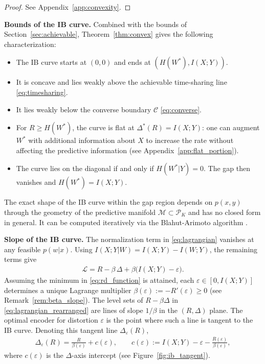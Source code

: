\documentclass[11pt]{article}
\begin{document}
\begin{proof}
    See Appendix~\ref{app:convexity}.
\end{proof}

\medskip
\noindent\textbf{Bounds of the IB curve.}
Combined with the bounds of Section~\ref{sec:achievable},
Theorem~\ref{thm:convex} gives the following characterization:
\begin{itemize}
    \item The IB curve starts at $(0,0)$ and ends at
    $(H(W^*),I(X;Y))$.
    \item It is concave and lies weakly above the achievable time-sharing line
    \eqref{eq:timesharing}.
    \item It lies weakly below the converse boundary $\mathcal{C}$
    \eqref{eq:converse}.
    \item For $R\geq H(W^*)$, the curve is flat at
    $\Delta^*(R)=I(X;Y)$: one can augment $W^*$ with additional
    information about $X$ to increase the rate without affecting
    the predictive information (see Appendix~\ref{app:flat_portion}).
    \item The curve lies on the diagonal if and only if $H(W^*|Y)=0$. The gap then vanishes and $H(W^*)=I(X;Y)$.
\end{itemize}

The exact shape of the IB curve within the gap region depends on
$p(x,y)$ through the geometry of the predictive manifold
$\mathcal{M}\subset\mathcal{P}_K$ and has no closed form in general.
It can be computed iteratively via the Blahut-Arimoto algorithm \cite{blahut1972computation,arimoto1972algorithm}.

\medskip
\noindent\textbf{Slope of the IB curve.}
The normalization term in \eqref{eq:lagrangian} vanishes at any feasible $p(w|x)$.
Using $I(X;Y|W)=I(X;Y)-I(W;Y)$, the remaining terms give
\begin{align}
    \mathcal{L} = R - \beta\,\Delta + \beta\bigl(I(X;Y)-\varepsilon\bigr).
    \label{eq:lagrangian_rearranged}
\end{align}
Assuming the minimum in \eqref{eq:rd_function} is attained, each
$\varepsilon\in[0,I(X;Y)]$ determines a unique Lagrange multiplier
$\beta(\varepsilon):=-R'(\varepsilon)\geq 0$ (see Remark~\ref{rem:beta_slope}).
The level sets of $R-\beta\Delta$ in \eqref{eq:lagrangian_rearranged} are lines of slope
$1/\beta$ in the $(R,\Delta)$ plane.
The optimal encoder for distortion $\varepsilon$ is the point where such a line is tangent to the IB curve.
Denoting this tangent line $\Delta_\varepsilon(R)$,
\begin{align}
    \Delta_\varepsilon(R) = \frac{R}{\beta(\varepsilon)} + c(\varepsilon),
    \qquad
    c(\varepsilon) := I(X;Y) - \varepsilon - \frac{R(\varepsilon)}{\beta(\varepsilon)},
    \label{eq:ib_tangent}
\end{align}
where $c(\varepsilon)$ is the $\Delta$-axis intercept (see Figure~\ref{fig:ib_tangent}).
\end{document}
